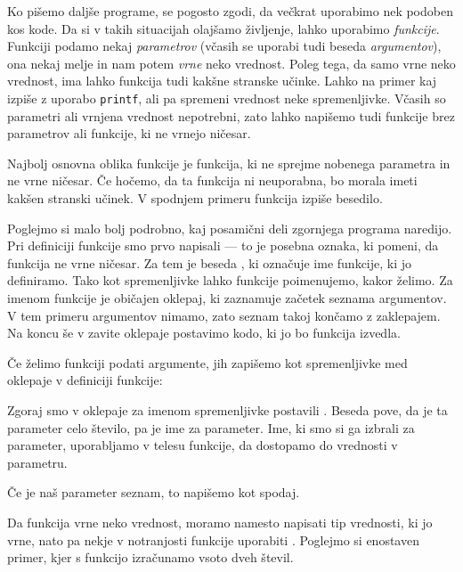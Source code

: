 
Ko pišemo daljše programe, se pogosto zgodi, da večkrat uporabimo nek podoben
kos kode.
Da si v takih situacijah olajšamo življenje, lahko uporabimo \emph{funkcije}.
Funkciji podamo nekaj \emph{parametrov} (včasih se uporabi tudi beseda
\emph{argumentov}), ona nekaj melje in nam potem \emph{vrne} neko vrednost.
Poleg tega, da samo vrne neko vrednost, ima lahko funkcija tudi kakšne stranske
učinke.
Lahko na primer kaj izpiše z uporabo \verb+printf+, ali pa spremeni vrednost
neke spremenljivke.
Včasih so parametri ali vrnjena vrednost nepotrebni, zato lahko napišemo tudi
funkcije brez parametrov ali funkcije, ki ne vrnejo ničesar.

Najbolj osnovna oblika funkcije je funkcija, ki ne sprejme nobenega parametra in
ne vrne ničesar.
Če hočemo, da ta funkcija ni neuporabna, bo morala imeti kakšen stranski učinek.
V spodnjem primeru funkcija izpiše besedilo.


Poglejmo si malo bolj podrobno, kaj posamični deli zgornjega programa naredijo.
Pri definiciji funkcije smo prvo napisali  --- to je posebna oznaka,
ki pomeni, da funkcija ne vrne ničesar.
Za tem je beseda , ki označuje ime funkcije, ki jo
definiramo.
Tako kot spremenljivke lahko funkcije poimenujemo, kakor želimo.
Za imenom funkcije je običajen oklepaj, ki zaznamuje začetek seznama argumentov.
V tem primeru argumentov nimamo, zato seznam takoj končamo z zaklepajem.
Na koncu še v zavite oklepaje postavimo kodo, ki jo bo funkcija izvedla.

Če želimo funkciji podati argumente, jih zapišemo kot spremenljivke med oklepaje
v definiciji funkcije:


Zgoraj smo v oklepaje za imenom spremenljivke postavili .
Beseda  pove, da je ta parameter celo število,  pa je ime za
parameter.
Ime, ki smo si ga izbrali za parameter, uporabljamo v telesu funkcije, da
dostopamo do vrednosti v parametru.

Če je naš parameter seznam, to napišemo kot spodaj.


Da funkcija vrne neko vrednost, moramo namesto  napisati tip
vrednosti, ki jo vrne, nato pa nekje v notranjosti funkcije uporabiti
.
Poglejmo si enostaven primer, kjer s funkcijo izračunamo vsoto dveh števil.

